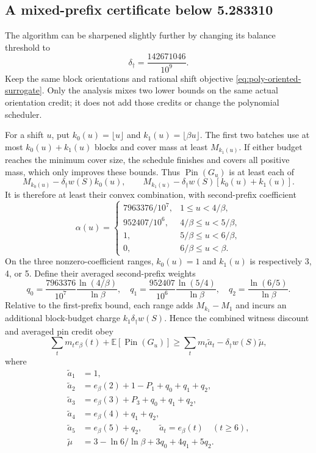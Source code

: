 \subsection{A mixed-prefix certificate below 5.283310}

The algorithm can be sharpened slightly further by changing its balance
threshold to
\[
 \delta_\dagger=\frac{142671046}{10^9}.
\]
Keep the same block orientations and rational shift objective
\eqref{eq:poly-oriented-surrogate}. Only the analysis mixes two lower
bounds on the same actual orientation credit; it does not add those
credits or change the polynomial scheduler.

For a shift $u$, put $k_0(u)=\lfloor u\rfloor$ and
$k_1(u)=\lfloor\beta u\rfloor$. The first two batches use at most
$k_0(u)+k_1(u)$ blocks and cover mass at least $M_{k_1(u)}$.
If either budget reaches the minimum cover size, the schedule finishes
and covers all positive mass, which only improves these bounds.
Thus $\operatorname{Pin}(G_u)$ is at least each of
\[
 M_{k_0(u)}-\delta_\dagger w(S)k_0(u),\qquad
 M_{k_1(u)}-\delta_\dagger w(S)[k_0(u)+k_1(u)].
\]
It is therefore at least their convex combination, with second-prefix
coefficient
\[
 \alpha(u)=
 \begin{cases}
 7963376/10^7,&1\le u<4/\beta,\\
 952407/10^6,&4/\beta\le u<5/\beta,\\
 1,&5/\beta\le u<6/\beta,\\
 0,&6/\beta\le u<\beta.
 \end{cases}
\]
On the three nonzero-coefficient ranges, $k_0(u)=1$ and $k_1(u)$ is
respectively 3, 4, or 5. Define their averaged second-prefix weights
\[
 q_0=\frac{7963376}{10^7}\frac{\ln(4/\beta)}{\ln\beta},\quad
 q_1=\frac{952407}{10^6}\frac{\ln(5/4)}{\ln\beta},\quad
 q_2=\frac{\ln(6/5)}{\ln\beta}.
\]
Relative to the first-prefix bound, each range adds $M_{k_1}-M_1$
and incurs an additional block-budget charge $k_1\delta_\dagger w(S)$.
Hence the combined witness discount and averaged pin credit obey
\[
 \sum_t m_t e_\beta(t)+\mathbb E[\operatorname{Pin}(G_u)]
 \ge\sum_t m_t\widetilde a_t-\delta_\dagger w(S)\widetilde\mu,
\]
where
\[
 \begin{aligned}
 \widetilde a_1&=1,\\
 \widetilde a_2&=e_\beta(2)+1-P_1+q_0+q_1+q_2,\\
 \widetilde a_3&=e_\beta(3)+P_3+q_0+q_1+q_2,\\
 \widetilde a_4&=e_\beta(4)+q_1+q_2,\\
 \widetilde a_5&=e_\beta(5)+q_2,\qquad
 \widetilde a_t=e_\beta(t)\quad(t\ge6),\\
 \widetilde\mu&=3-\ln6/\ln\beta+3q_0+4q_1+5q_2.
 \end{aligned}
\]
